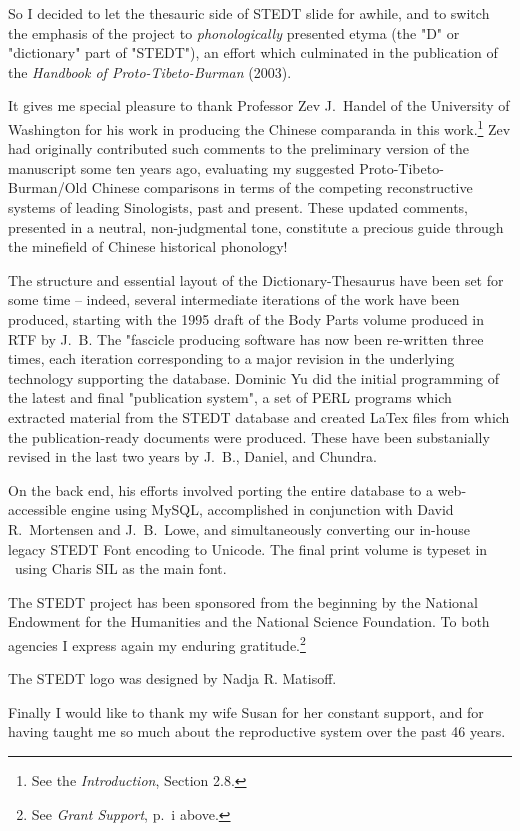 So I decided to let the thesauric side of STEDT slide for awhile, and to switch the emphasis of the project to \textit{phonologically} presented etyma (the "D" or "dictionary" part of "STEDT"), an effort which culminated in the publication of the \textit{Handbook of Proto-Tibeto-Burman} (2003).

It gives me special pleasure to thank Professor Zev J.\ Handel of the University of Washington for his work in producing the Chinese comparanda in this work.\footnote{See the \textit{Introduction}, Section 2.8.}   Zev had originally contributed such comments to the preliminary version of the manuscript some ten years ago, evaluating my suggested Proto-Tibeto-Burman/Old Chinese comparisons in terms of the competing reconstructive systems of leading Sinologists, past and present.  These updated comments, presented in a neutral, non-judgmental tone, constitute a precious guide through the minefield of Chinese historical phonology!

The structure and essential layout of the Dictionary-Thesaurus have been set for some time -- indeed, several intermediate iterations of the work have been produced, starting with the 1995 draft of the Body Parts volume produced in RTF by J.~B.  The "fascicle producing software has now been re-written three times, each iteration corresponding to a major revision in the underlying technology supporting the database. \mbox{Dominic} Yu did the initial programming of the latest and final "publication system", a set of PERL programs which extracted material from the STEDT database and created LaTex files from which the publication-ready documents were produced.  These have been substanially revised in the last two years by J.~B., Daniel, and Chundra.  

On the back end, his efforts involved porting the entire database to a web-accessible engine using MySQL, accomplished in conjunction with David R.\ Mortensen and J.~B.\ Lowe, and simultaneously converting our in-house legacy STEDT Font encoding to Unicode. The final print volume is typeset in \XeLaTeX\ using Charis SIL as the main font.

The STEDT project has been sponsored from the beginning by the National Endowment for the Humanities and the National Science Foundation.  To both agencies I express again my enduring gratitude.\footnote{See \textit{Grant Support}, p.~i above.}

The STEDT logo was designed by Nadja R. Matisoff.

Finally I would like to thank my wife Susan for her constant support, and for having taught me so much about the reproductive system over the past 46 years.

